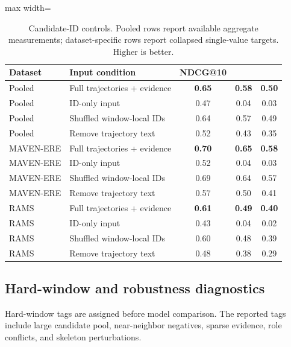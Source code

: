 \documentclass{article}
\begin{document}
\begin{table}[h]
\centering
\caption{Candidate-ID controls. Pooled rows report available aggregate measurements; dataset-specific rows report collapsed single-value targets. Higher is better.}
\label{tab:id_controls}
\small
\begin{adjustbox}{max width=\linewidth}
\begin{tabular}{l l c c c}
\toprule
Dataset & Input condition & NDCG@10 & \EvidCons@10 & \CertNDCG@10 \\
\midrule
Pooled & Full trajectories + evidence & \textbf{0.65} & \textbf{0.58} & \textbf{0.50} \\
Pooled & ID-only input & 0.47 & 0.04 & 0.03 \\
Pooled & Shuffled window-local IDs & 0.64 & 0.57 & 0.49 \\
Pooled & Remove trajectory text & 0.52 & 0.43 & 0.35 \\
\midrule
MAVEN-ERE & Full trajectories + evidence & \textbf{0.70} & \textbf{0.65} & \textbf{0.58} \\
MAVEN-ERE & ID-only input & 0.52 & 0.04 & 0.03 \\
MAVEN-ERE & Shuffled window-local IDs & 0.69 & 0.64 & 0.57 \\
MAVEN-ERE & Remove trajectory text & 0.57 & 0.50 & 0.41 \\
\midrule
RAMS & Full trajectories + evidence & \textbf{0.61} & \textbf{0.49} & \textbf{0.40} \\
RAMS & ID-only input & 0.43 & 0.04 & 0.02 \\
RAMS & Shuffled window-local IDs & 0.60 & 0.48 & 0.39 \\
RAMS & Remove trajectory text & 0.48 & 0.38 & 0.29 \\
\bottomrule
\end{tabular}
\end{adjustbox}
\end{table}

\subsection{Hard-window and robustness diagnostics}
\label{sec:app_hard_windows}

Hard-window tags are assigned before model comparison. The reported tags include large candidate pool, near-neighbor negatives, sparse evidence, role conflicts, and skeleton perturbations.
\end{document}
